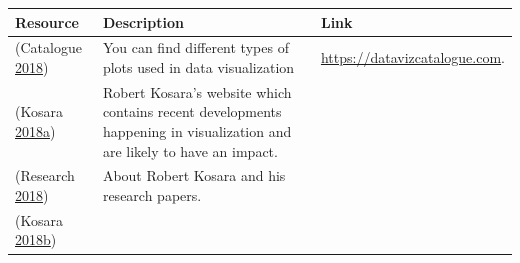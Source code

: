 \documentclass[]{book}
\theoremstyle{definition}
\theoremstyle{definition}
\theoremstyle{definition}
\theoremstyle{remark}
\begin{document}
\begin{longtable}[]{@{}lll@{}}
\toprule
\begin{minipage}[b]{0.15\columnwidth}\raggedright\strut
\textbf{Resource}\strut
\end{minipage} & \begin{minipage}[b]{0.28\columnwidth}\raggedright\strut
\textbf{Description}\strut
\end{minipage} & \begin{minipage}[b]{0.48\columnwidth}\raggedright\strut
\textbf{Link}\strut
\end{minipage}\tabularnewline
\midrule
\endhead
\begin{minipage}[t]{0.15\columnwidth}\raggedright\strut
(Catalogue \protect\hyperlink{ref-charts_viz}{2018})\strut
\end{minipage} & \begin{minipage}[t]{0.28\columnwidth}\raggedright\strut
You can find different types of plots used in data visualization\strut
\end{minipage} & \begin{minipage}[t]{0.48\columnwidth}\raggedright\strut
\href{https://datavizcatalogue.com/search.html}{https://datavizcatalogue.com}.\strut
\end{minipage}\tabularnewline
\begin{minipage}[t]{0.15\columnwidth}\raggedright\strut
(Kosara
\protect\hyperlink{ref-eagereyes_viz}{2018}\protect\hyperlink{ref-eagereyes_viz}{a})\strut
\end{minipage} & \begin{minipage}[t]{0.28\columnwidth}\raggedright\strut
Robert Kosara's website which contains recent developments happening in
visualization and are likely to have an impact.\strut
\end{minipage}\tabularnewline
\begin{minipage}[t]{0.15\columnwidth}\raggedright\strut
(Research \protect\hyperlink{ref-research_viz}{2018})\strut
\end{minipage} & \begin{minipage}[t]{0.28\columnwidth}\raggedright\strut
About Robert Kosara and his research papers.\strut
\end{minipage}\tabularnewline
\begin{minipage}[t]{0.15\columnwidth}\raggedright\strut
(Kosara
\protect\hyperlink{ref-twitter_Kosara}{2018}\protect\hyperlink{ref-twitter_Kosara}{b})\strut
\end{minipage} & \begin{minipage}[t]{0.28\columnwidth}\raggedright\strut

\end{minipage}
\end{longtable}
\end{document}
